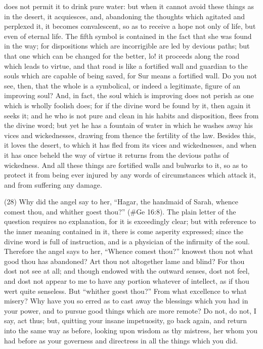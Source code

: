 does not permit it to drink pure water: but when it cannot avoid these things as in the desert, it
acquiesces, and, abandoning the thoughts which agitated and perplexed it, it becomes
convalescent, so as to receive a hope not only of life, but even of eternal life. The fifth symbol is
contained in the fact that she was found in the way; for dispositions which are incorrigible are led
by devious paths; but that one which can be changed for the better, lo! it proceeds along the road
which leads to virtue, and that road is like a fortified wall and guardian to the souls which are
capable of being saved, for Sur means a fortified wall. Do you not see, then, that the whole is a
symbolical, or indeed a legitimate, figure of an improving soul? And, in fact, the soul which is
improving does not perish as one which is wholly foolish does; for if the divine word be found by it,
then again it seeks it; and he who is not pure and clean in his habits and disposition, flees from the
divine word; but yet he has a fountain of water in which he washes away his vices and
wickednesses, drawing from thence the fertility of the law. Besides this, it loves the desert, to which
it has fled from its vices and wickednesses, and when it has once beheld the way of virtue it
returns from the devious paths of wickedness. And all these things are fortified walls and bulwarks
to it, so as to protect it from being ever injured by any words of circumstances which attack it, and
from suffering any damage.

(28) Why did the angel say to her, ``Hagar, the handmaid of Sarah, whence comest thou, and
whither goest thou?'' (\#Ge 16:8). The plain letter of the question requires no explanation, for it
is exceedingly clear; but with reference to the inner meaning contained in it, there is come asperity
expressed; since the divine word is full of instruction, and is a physician of the infirmity of the soul.
Therefore the angel says to her, ``Whence comest thou?'' knowest thou not what good thou has
abandoned? Art thou not altogether lame and blind? For thou dost not see at all; and though
endowed with the outward senses, dost not feel, and dost not appear to me to have any portion
whatever of intellect, as if thou wert quite senseless. But ``whither goest thou?'' From what
excellence to what misery? Why have you so erred as to cast away the blessings which you had in
your power, and to pursue good things which are more remote? Do not, do not, I say, act thus; but,
quitting your insane impetuosity, go back again, and return into the same way as before, looking
upon wisdom as thy mistress, her whom you had before as your governess and directress in all the
things which you did.

